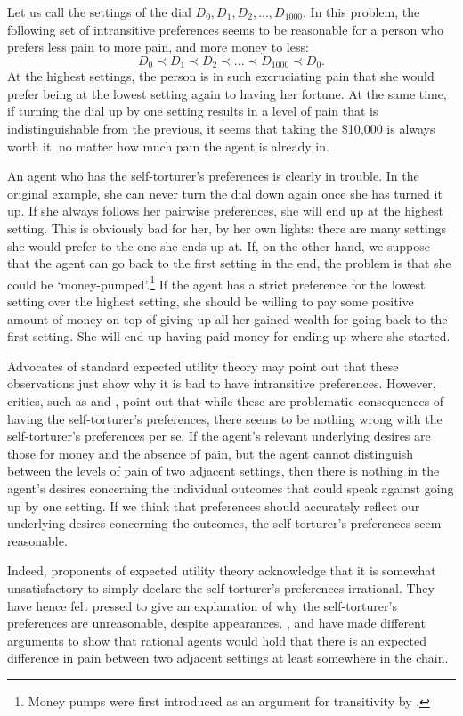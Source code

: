 Let us call the settings of the dial $D_0, D_1, D_2,..., D_{1000}$. In this problem, the following set of intransitive preferences seems to be reasonable for a person who prefers less pain to more pain, and more money to less:
$$D_0 \prec D_1 \prec D_2 \prec ... \prec D_{1000} \prec D_0.$$
At the highest settings, the person is in such excruciating pain that she would prefer being at the lowest setting again to having her fortune. At the same time, if turning the dial up by one setting results in a level of pain that is indistinguishable from the previous, it seems that taking the \$10,000 is always worth it, no matter how much pain the agent is already in.

An agent who has the self-torturer's preferences is clearly in trouble. In the original example, she can never turn the dial down again once she has turned it up. If she always follows her pairwise preferences, she will end up at the highest setting. This is obviously bad for her, by her own lights: there are many settings she would prefer to the one she ends up at. If, on the other hand, we suppose that the agent can go back to the first setting in the end, the problem is that she could be `money-pumped'.\footnote{Money pumps were first introduced as an argument for transitivity by \citet{DavidsonMcKinseySuppes1955}.} If the agent has a strict preference for the lowest setting over the highest setting, she should be willing to pay some positive amount of money on top of giving up all her gained wealth for going back to the first setting. She will end up having paid money for ending up where she started.

Advocates of standard expected utility theory may point out that these observations just show why it is bad to have intransitive preferences. However, critics, such as \citet{Andreou2006} and \citet{TenenbaumRaffman2012}, point out that while these are problematic consequences of having the self-torturer's preferences, there seems to be nothing wrong with the self-torturer's preferences per se. If the agent's relevant underlying desires are those for money and the absence of pain, but the agent cannot distinguish between the levels of pain of two adjacent settings, then there is nothing in the agent's desires concerning the individual outcomes that could speak against going up by one setting. If we think that preferences should accurately reflect our underlying desires concerning the outcomes, the self-torturer's preferences seem reasonable.

Indeed, proponents of expected utility theory acknowledge that it is somewhat unsatisfactory to simply declare the self-torturer's preferences irrational. They have hence felt pressed to give an explanation of why the self-torturer's preferences are unreasonable, despite appearances. \citet{ArntzeniusMcCarthy1997}, and \citet{VoorhoeveBinmore2006} have made different arguments to show that rational agents would hold that there is an expected difference in pain between two adjacent settings at least somewhere in the chain.

